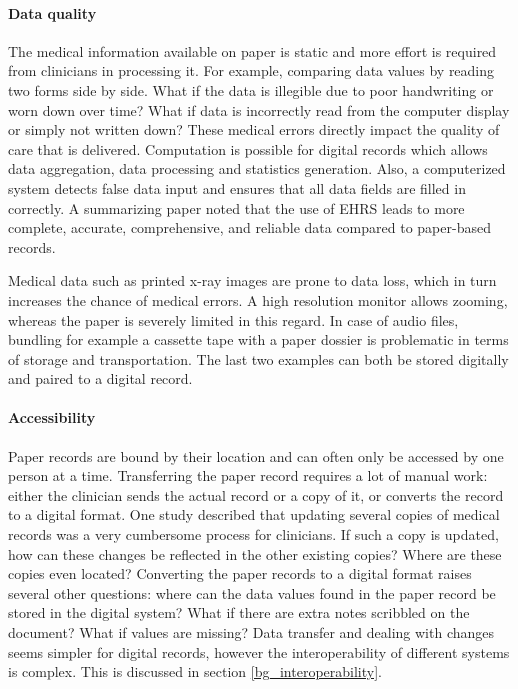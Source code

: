     \paragraph{Data quality} The medical information available on paper is static and more effort is required from clinicians in processing it. For example, comparing data values by reading two forms side by side. What if the data is illegible due to poor handwriting or worn down over time? What if data is incorrectly read from the computer display or simply not written down? These medical errors directly impact the quality of care that is delivered\cite{Elnahal2011}\cite{Hillestad2005}. Computation is possible for digital records which allows data aggregation, data processing and statistics generation. Also, a computerized system detects false data input and ensures that all data fields are filled in correctly. A summarizing paper noted that the use of EHRS leads to more complete, accurate, comprehensive, and reliable data compared to paper-based records\cite{Hayrinen2008}.

    Medical data such as printed x-ray images are prone to data loss, which in turn increases the chance of medical errors. A high resolution monitor allows zooming, whereas the paper is severely limited in this regard. In case of audio files, bundling for example a cassette tape with a paper dossier is problematic in terms of storage and transportation. The last two examples can both be stored digitally and paired to a digital record.

    \paragraph{Accessibility} Paper records are bound by their location and can often only be accessed by one person at a time. Transferring the paper record requires a lot of manual work: either the clinician sends the actual record or a copy of it, or converts the record to a digital format. One study described that updating several copies of medical records was a very cumbersome process for clinicians\cite{Tange1999}. If such a copy is updated, how can these changes be reflected in the other existing copies? Where are these copies even located? Converting the paper records to a digital format raises several other questions: where can the data values found in the paper record be stored in the digital system? What if there are extra notes scribbled on the document? What if values are missing? Data transfer and dealing with changes seems simpler for digital records, however the interoperability of different systems is complex. This is discussed in section \ref{bg_interoperability}. %

